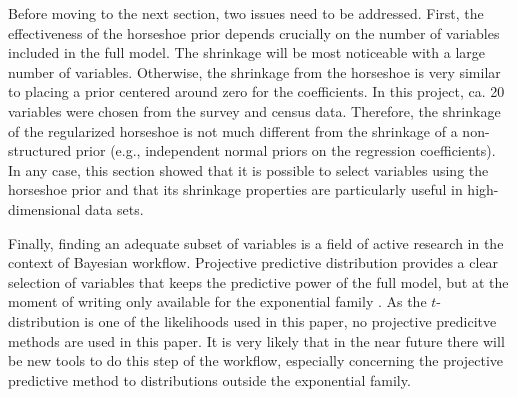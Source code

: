 Before moving to the next section, two issues need to be addressed.
First, the effectiveness of the horseshoe prior depends crucially on the number of variables included in the full model.
The shrinkage will be most noticeable with a large number of variables.
Otherwise, the shrinkage from the horseshoe is very similar to placing a prior centered around zero for the coefficients.
In this project, ca. 20 variables were chosen from the survey and census data.
Therefore, the shrinkage of the regularized horseshoe is not much different from the shrinkage of a non-structured prior (e.g., independent normal priors on the regression coefficients).
In any case, this section showed that it is possible to select variables using the horseshoe prior and that its shrinkage properties are particularly useful in high-dimensional data sets.

Finally, finding an adequate subset of variables is a field of active research in the context of Bayesian workflow.
Projective predictive distribution provides a clear selection of variables that keeps the predictive power of the full model, but at the moment of writing only available for the exponential family \citep{piironen_sparsity_2017}.
As the $t$-distribution is one of the likelihoods used in this paper, no projective predicitve methods are used in this paper.
It is very likely that in the near future there will be new tools to do this step of the workflow, especially concerning the projective predictive method to distributions outside the exponential family.

